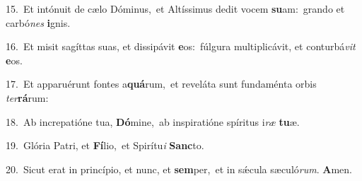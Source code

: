 {\numbfont\textcolor{\numbcolor}{15.}}~Et intónuit de cælo Dóminus,~\dagger et Altíssimus dedit vocem \textbf{su}\-am:~\star grando et carbó\textit{nes} \textbf{i}\-gnis.\par
{\numbfont\textcolor{\numbcolor}{16.}}~Et misit sagíttas suas, et dissipávit \textbf{e}\-os:~\star fúlgura multiplicávit, et conturbá\textit{vit} \textbf{e}\-os.\par
{\numbfont\textcolor{\numbcolor}{17.}}~Et apparuérunt fontes a\-\textbf{quá}\-rum,~\star et reveláta sunt fundaménta orbis \textit{ter}\-\textbf{rá}rum:\par
{\numbfont\textcolor{\numbcolor}{18.}}~Ab increpatióne tua, \textbf{Dó}\-mine,~\star ab inspiratióne spíritus i\textit{ræ} \textbf{tu}\-æ.\par
{\numbfont\textcolor{\numbcolor}{19.}}~Glória Patri, et \textbf{Fí}\-lio,~\star et Spirítu\textit{i} \textbf{Sanc}\-to.\par
{\numbfont\textcolor{\numbcolor}{20.}}~Sicut erat in princípio, et nunc, et \textbf{sem}\-per,~\star et in sǽcula sæculó\-\textit{rum}\-. \textbf{A}\-men.\par

